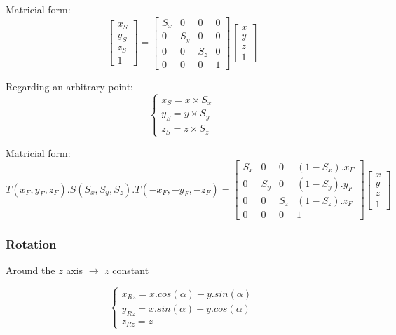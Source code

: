 \documentclass[a4paper]{article}
\begin{document}
\begin{flushleft}
Matricial form:
\begin{equation}
\begin{bmatrix}
	x_S \\
	y_S \\
	z_S \\
	1
\end{bmatrix}
=
\begin{bmatrix}
	S_x & 0 & 0 & 0 \\
	0 & S_y & 0 & 0 \\
	0 & 0 & S_z & 0 \\
	0 & 0 & 0 & 1
\end{bmatrix}
\begin{bmatrix}
	x \\
	y \\
	z \\
	1
\end{bmatrix}
\end{equation}

Regarding an arbitrary point:
\begin{equation}
\begin{cases}
	x_S = x \times S_x \\
	y_S = y \times S_y \\
	z_S = z \times S_z
\end{cases}
\end{equation}

Matricial form:
\begin{equation}
T(x_F, y_F, z_F).S(S_x, S_y, S_z).T(-x_F, -y_F, -z_F) =
\begin{bmatrix}
	S_x & 0 & 0 & (1-S_x).x_F \\
	0 & S_y & 0 & (1-S_y).y_F \\
	0 & 0 & S_z & (1-S_z).z_F \\
	0 & 0 & 0 & 1
\end{bmatrix}
\begin{bmatrix}
	x \\
	y \\
	z \\
	1
\end{bmatrix}
\end{equation}

\subsubsection{Rotation}
Around the $z$ axis $\rightarrow$ $z$ constant

\begin{equation}
\begin{cases}
	x_{Rz} = x.cos(\alpha)-y.sin(\alpha) \\
	y_{Rz} = x.sin(\alpha)+y.cos(\alpha) \\
	z_{Rz} = z
\end{cases}
\end{equation}


\end{flushleft}
\end{document}
